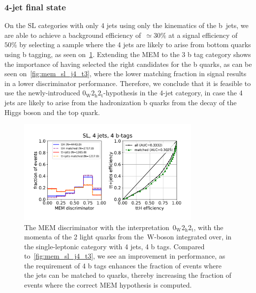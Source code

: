\subsubsection{4-jet final state}
On the SL categories with only 4 jets using only the kinematics of the b~jets, we are able to achieve a background efficiency of~$\simeq 30\%$ at a signal efficiency of~$50\%$ by selecting a sample where the 4 jets are likely to arise from bottom quarks using b tagging, as seen on~\cref{fig:mem_sl_j4_t4}. Extending the MEM to the 3 b tag category shows the importance of having selected the right candidates for the b quarks, as can be seen on~\cref{fig:mem_sl_j4_t3}, where the lower matching fraction in signal results in a lower discriminator performance. Therefore, we conclude that it is feasible to use the newly-introduced $0_{\mathrm{W}} 2_{\mathrm{h}} 2_{\mathrm{t}}$-hypothesis in the 4-jet category, in case the 4 jets are likely to arise from the hadronization b quarks from the decay of the Higgs boson and the top quark.

\begin{figure}[ht]
\begin{centering}
\includegraphics[width = 0.8\textwidth]{figures/mem/mem_sl_j4_t4.pdf}
\caption[MEM with the~$0_{\mathrm{W}} 2_{\mathrm{h}} 2_{\mathrm{t}}$ interpretation in the 4~jet, 4~b~tag category]{The MEM discriminator with the interpretation~$0_{\mathrm{W}} 2_{\mathrm{h}} 2_{\mathrm{t}}$, with the momenta of the 2 light quarks from the~$\mathrm{W}$-boson integrated over, in the single-leptonic category with 4 jets, 4 b tags. Compared to~\cref{fig:mem_sl_j4_t3}, we see an improvement in performance, as the requirement of 4 b tags enhances the fraction of events where the jets can be matched to quarks, thereby increasing the fraction of events where the correct MEM hypothesis is computed.}
\label{fig:mem_sl_j4_t4}
\end{centering}
\end{figure}

